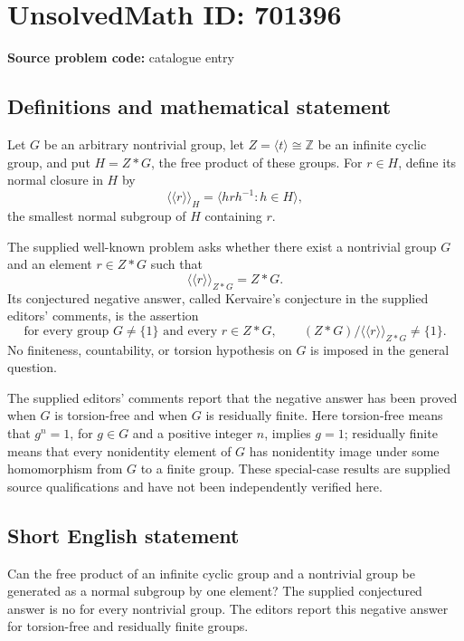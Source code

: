 \documentclass[11pt]{article}
\newcommand{\Z}{\mathbb{Z}}
\begin{document}
\section*{UnsolvedMath ID: 701396}
\textbf{Source problem code:} catalogue entry
\subsection{Definitions and mathematical statement}
Let \(G\) be an arbitrary nontrivial group, let \(Z=\langle t\rangle\cong\Z\) be an infinite cyclic group, and put \(H=Z*G\), the free product of these groups. For \(r\in H\), define its normal closure in \(H\) by
\[
\langle\!\langle r\rangle\!\rangle_H
=\bigl\langle h r h^{-1}:h\in H\bigr\rangle,
\]
the smallest normal subgroup of \(H\) containing \(r\).

The supplied well-known problem asks whether there exist a nontrivial group \(G\) and an element \(r\in Z*G\) such that
\[
\langle\!\langle r\rangle\!\rangle_{Z*G}=Z*G.
\]
Its conjectured negative answer, called Kervaire's conjecture in the supplied editors' comments, is the assertion
\[
\text{for every group }G\ne\{1\}\text{ and every }r\in Z*G,
\qquad
(Z*G)/\langle\!\langle r\rangle\!\rangle_{Z*G}\ne\{1\}.
\]
No finiteness, countability, or torsion hypothesis on \(G\) is imposed in the general question.

The supplied editors' comments report that the negative answer has been proved when \(G\) is torsion-free and when \(G\) is residually finite. Here torsion-free means that \(g^n=1\), for \(g\in G\) and a positive integer \(n\), implies \(g=1\); residually finite means that every nonidentity element of \(G\) has nonidentity image under some homomorphism from \(G\) to a finite group. These special-case results are supplied source qualifications and have not been independently verified here.
\subsection{Short English statement}
Can the free product of an infinite cyclic group and a nontrivial group be generated as a normal subgroup by one element? The supplied conjectured answer is no for every nontrivial group. The editors report this negative answer for torsion-free and residually finite groups.
\end{document}
